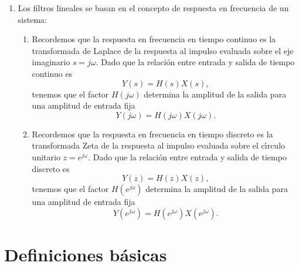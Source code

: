 \begin{enumerate}
\begin{enumerate}
\item   Generar cierto desfasaje entre entrada y salida (\'{u}til para compensar retardos 
en sistemas de comunicaci\'{o}n.)
        
\item   Generar estimaciones de la derivada de la entrada.
        
\item   Eliminaci\'{o}n de ruido.
        
\item   Otras aplicaciones.
\end{enumerate}

\item Los filtros lineales se basan en el concepto de respuesta en frecuencia de un sistema: 
\begin{enumerate}
\item   Recordemos que la respuesta en frecuencia en tiempo continuo es la transformada de Laplace 
de la respuesta al impulso evaluada sobre el eje imaginario $s = j \omega$. 
Dado que la relaci\'{o}n entre entrada y salida de tiempo continuo es
\begin{equation}
  Y(s) = H(s) X(s),
\end{equation}
tenemos que el factor $H( j \omega)$ determina la amplitud de la salida para una amplitud de entrada fija
\begin{equation}
  Y(j \omega) = H(j \omega) X(j \omega).
\end{equation}
      
\item   Recordemos que la respuesta en frecuencia en tiempo discreto es la transformada Zeta de la 
respuesta al impulso evaluada sobre el c\'{\i}rculo unitario $z = e^{j \omega}$. 
Dado que la relaci\'{o}n entre entrada y salida de tiempo discreto es
\begin{equation}
  Y(z) = H(z) X(z),
\end{equation}
tenemos que el factor $H(e^{j \omega})$ determina la amplitud de la salida para una amplitud de entrada 
fija
\begin{equation}
  Y(e^{j \omega}) = H(e^{j \omega}) X(e^{j \omega}).
\end{equation}

\end{enumerate}

\end{enumerate}

\section{Definiciones b\'{a}sicas}


